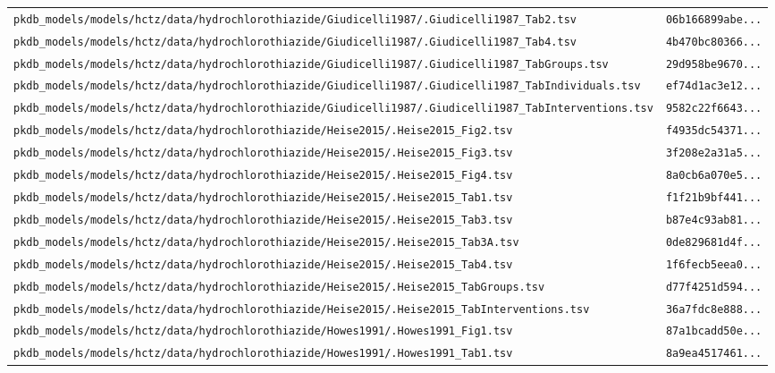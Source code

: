 \documentclass{article}
\begin{document}
\begin{longtable}{ll}
\texttt{pkdb\_models/models/hctz/data/hydrochlorothiazide/Giudicelli1987/.Giudicelli1987\_Tab2.tsv} & \texttt{06b166899abe...} \\
\texttt{pkdb\_models/models/hctz/data/hydrochlorothiazide/Giudicelli1987/.Giudicelli1987\_Tab4.tsv} & \texttt{4b470bc80366...} \\
\texttt{pkdb\_models/models/hctz/data/hydrochlorothiazide/Giudicelli1987/.Giudicelli1987\_TabGroups.tsv} & \texttt{29d958be9670...} \\
\texttt{pkdb\_models/models/hctz/data/hydrochlorothiazide/Giudicelli1987/.Giudicelli1987\_TabIndividuals.tsv} & \texttt{ef74d1ac3e12...} \\
\texttt{pkdb\_models/models/hctz/data/hydrochlorothiazide/Giudicelli1987/.Giudicelli1987\_TabInterventions.tsv} & \texttt{9582c22f6643...} \\
\texttt{pkdb\_models/models/hctz/data/hydrochlorothiazide/Heise2015/.Heise2015\_Fig2.tsv} & \texttt{f4935dc54371...} \\
\texttt{pkdb\_models/models/hctz/data/hydrochlorothiazide/Heise2015/.Heise2015\_Fig3.tsv} & \texttt{3f208e2a31a5...} \\
\texttt{pkdb\_models/models/hctz/data/hydrochlorothiazide/Heise2015/.Heise2015\_Fig4.tsv} & \texttt{8a0cb6a070e5...} \\
\texttt{pkdb\_models/models/hctz/data/hydrochlorothiazide/Heise2015/.Heise2015\_Tab1.tsv} & \texttt{f1f21b9bf441...} \\
\texttt{pkdb\_models/models/hctz/data/hydrochlorothiazide/Heise2015/.Heise2015\_Tab3.tsv} & \texttt{b87e4c93ab81...} \\
\texttt{pkdb\_models/models/hctz/data/hydrochlorothiazide/Heise2015/.Heise2015\_Tab3A.tsv} & \texttt{0de829681d4f...} \\
\texttt{pkdb\_models/models/hctz/data/hydrochlorothiazide/Heise2015/.Heise2015\_Tab4.tsv} & \texttt{1f6fecb5eea0...} \\
\texttt{pkdb\_models/models/hctz/data/hydrochlorothiazide/Heise2015/.Heise2015\_TabGroups.tsv} & \texttt{d77f4251d594...} \\
\texttt{pkdb\_models/models/hctz/data/hydrochlorothiazide/Heise2015/.Heise2015\_TabInterventions.tsv} & \texttt{36a7fdc8e888...} \\
\texttt{pkdb\_models/models/hctz/data/hydrochlorothiazide/Howes1991/.Howes1991\_Fig1.tsv} & \texttt{87a1bcadd50e...} \\
\texttt{pkdb\_models/models/hctz/data/hydrochlorothiazide/Howes1991/.Howes1991\_Tab1.tsv} & \texttt{8a9ea4517461...} \\

\end{longtable}
\end{document}
